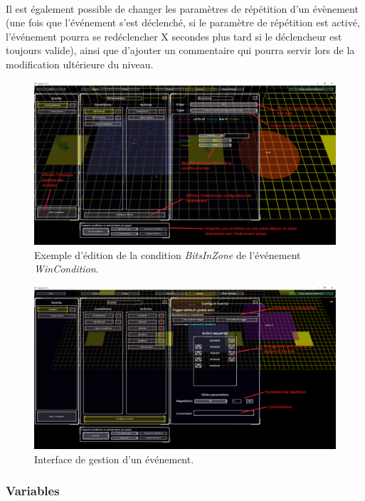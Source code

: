 \documentclass[a4paper]{article}
\begin{document}
\paragraph{ }
Il est également possible de changer les paramètres de répétition d'un évènement (une fois que l'événement s'est déclenché, si le paramètre de répétition est activé, l'événement pourra se redéclencher X secondes plus tard si le déclencheur est toujours valide), ainsi que d'ajouter un commentaire qui pourra servir lors de la modification ultérieure du niveau.
\begin{figure}[H]
\centering
\includegraphics[width=\linewidth]{editor-trigger.png}
\caption{Exemple d'édition de la condition \textit{BitsInZone} de l'événement \textit{WinCondition}.}
\label{fig:editor-trigger}
\end{figure}
\begin{figure}[H]
\centering
\includegraphics[width=\linewidth]{editor-eventconfig.png}
\caption{Interface de gestion d'un événement.}
\label{fig:editor-eventconfig}
\end{figure}
\subsubsection{Variables}
\end{document}
